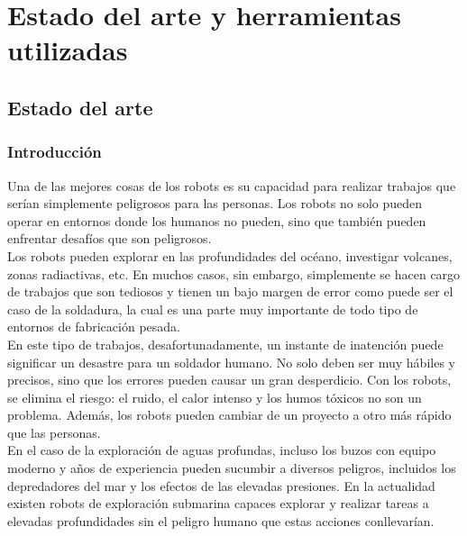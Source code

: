 

\newpage

\chapter[Estado del arte y herramientas utilizadas]{Estado del arte y herramientas utilizadas}
\label{chap:herramientas}


\section{ Estado del arte }

\subsection{Introducción}


Una de las mejores cosas de los robots es su capacidad para realizar trabajos que serían simplemente peligrosos para las personas. Los robots no solo pueden operar en entornos
donde los humanos no pueden, sino que también pueden enfrentar desafíos que son peligrosos.\\

Los robots pueden explorar en las profundidades del océano, investigar volcanes, zonas radiactivas, etc. En muchos casos, sin embargo, simplemente se hacen cargo de trabajos
que son tediosos y tienen un bajo margen de error como puede ser el caso de la soldadura, la cual es una parte muy importante de todo tipo de entornos de fabricación pesada.\\

En este tipo de trabajos, desafortunadamente, un instante de inatención puede significar un desastre para un soldador humano. No solo deben ser muy hábiles y precisos, sino que los errores pueden 
causar un gran desperdicio. Con los robots, se elimina el riesgo: el ruido, el calor intenso y los humos tóxicos no son un problema. Además, los robots pueden cambiar de un
proyecto a otro más rápido que las personas.\\

En el caso de la exploración de aguas profundas, incluso los buzos con equipo moderno y años de experiencia pueden sucumbir a diversos peligros, incluidos los depredadores del
mar y los efectos de las elevadas presiones. En la actualidad existen robots de exploración submarina capaces explorar y realizar tareas 
a elevadas profundidades sin el peligro humano que estas acciones conllevarían.\\

